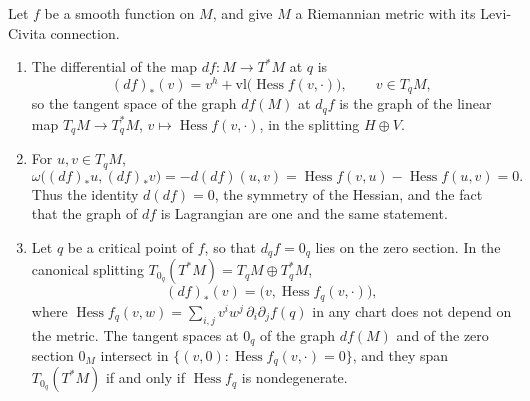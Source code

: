\begin{corollary}\label{symplectic-geometry:corollary-graph-differential}
Let $f$ be a smooth function on $M$, and give $M$ a Riemannian metric with its Levi-Civita connection.
\begin{enumerate}
\item The differential of the map $df \colon M \to T^*M$ at $q$ is
\[
(df)_*(v) = v^h + \mathrm{vl}\bigl(\operatorname{Hess}f(v, \cdot)\bigr), \qquad v \in T_qM,
\]
so the tangent space of the graph $df(M)$ at $d_qf$ is the graph of the linear map $T_qM \to T^*_qM$, $v \mapsto \operatorname{Hess}f(v, \cdot)$, in the splitting $H \oplus V$.
\item For $u, v \in T_qM$,
\[
\omega\bigl((df)_*u, (df)_*v\bigr) = -d(df)(u, v) = \operatorname{Hess}f(v, u) - \operatorname{Hess}f(u, v) = 0 .
\]
Thus the identity $d(df) = 0$, the symmetry of the Hessian, and the fact that the graph of $df$ is Lagrangian are one and the same statement.
\item Let $q$ be a critical point of $f$, so that $d_qf = 0_q$ lies on the zero section. In the canonical splitting $T_{0_q}(T^*M) = T_qM \oplus T^*_qM$,
\[
(df)_*(v) = \bigl(v, \operatorname{Hess}f_q(v, \cdot)\bigr),
\]
where $\operatorname{Hess}f_q(v, w) = \sum_{i,j}v^iw^j\,\partial_i\partial_jf(q)$ in any chart does not depend on the metric. The tangent spaces at $0_q$ of the graph $df(M)$ and of the zero section $0_M$
intersect in $\{(v, 0) : \operatorname{Hess}f_q(v, \cdot) = 0\}$, and they span $T_{0_q}(T^*M)$ if and only if $\operatorname{Hess}f_q$ is nondegenerate.
\end{enumerate}
\end{corollary}


